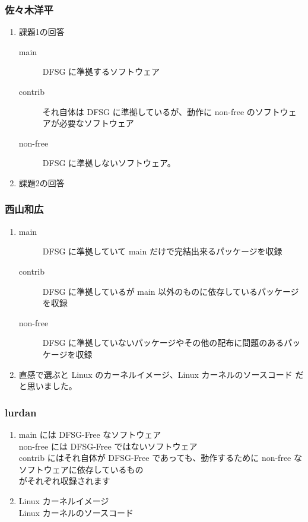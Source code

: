 \documentclass[cjk,dvipdfmx,10pt,%
hyperref={bookmarks=true,bookmarksnumbered=true,bookmarksopen=false,%
colorlinks=false,%
pdftitle={第 58 回 関西 Debian 勉強会},%
pdfauthor={倉敷・のがた・河田・佐々木},%
pdfsubject={資料},%
}]{beamer}
\begin{document}
\begin{frame}
\frametitle{ 佐々木洋平 }
\begin{enumerate}
  \item 課題1の回答
  \begin{description}
    \item[main] DFSG に準拠するソフトウェア
    \item[contrib] それ自体は DFSG に準拠しているが、動作に non-free のソフトウェアが必要なソフトウェア
    \item[non-free] DFSG に準拠しないソフトウェア。
  \end{description}
  \item 課題2の回答
\end{enumerate}
\end{frame}

\begin{frame}
\frametitle{ 西山和広 }
  \begin{enumerate}
  \item
    \begin{description}
    \item [main] DFSG に準拠していて main だけで完結出来るパッケージを収録
    \item [contrib] DFSG に準拠しているが main 以外のものに依存しているパッケージを収録
    \item [non-free] DFSG に準拠していないパッケージやその他の配布に問題のあるパッケージを収録
    \end{description}
  \item 直感で選ぶと Linux のカーネルイメージ、Linux カーネルのソースコード だと思いました。
  \end{enumerate}
\end{frame}

\begin{frame}
\frametitle{ lurdan }
  \begin{enumerate}
  \item main には DFSG-Free なソフトウェア\\
non-free には DFSG-Free ではないソフトウェア\\
contrib にはそれ自体が DFSG-Free であっても、動作するために non-free なソフトウェアに依存しているもの\\
がそれぞれ収録されます
\item Linux カーネルイメージ\\
Linux カーネルのソースコード
  \end{enumerate}
\end{frame}
\end{document}
